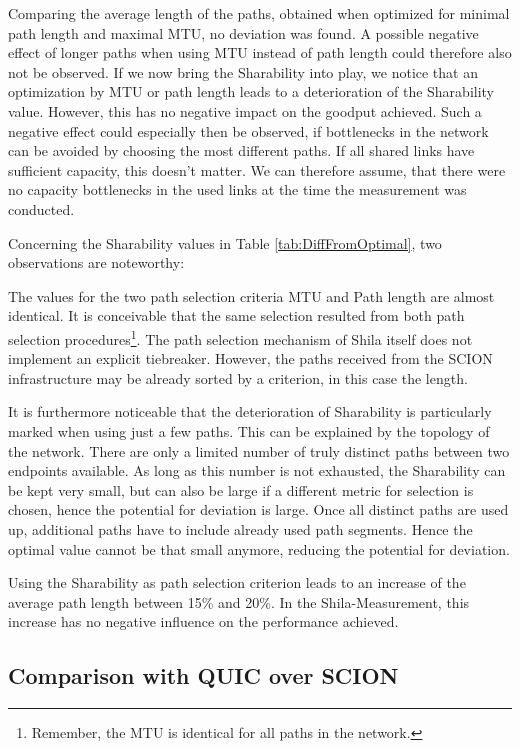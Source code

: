 Comparing the average length of the paths, obtained when optimized for minimal path length and maximal MTU, no deviation was found. A possible negative effect of longer paths when using MTU instead of path length could therefore also not be observed. If we now bring the Sharability into play, we notice that an optimization by MTU or path length leads to a deterioration of the Sharability value. However, this has no negative impact on the goodput achieved. Such a negative effect could especially then be observed,  if bottlenecks in the network can be avoided by choosing the most different paths. If all shared links have sufficient capacity, this doesn't matter. We can therefore assume, that there were no capacity bottlenecks in the used links at the time the measurement was conducted. 

Concerning the Sharability values in Table \ref{tab:DiffFromOptimal}, two observations are noteworthy:

The values for the two path selection criteria MTU and Path length are almost identical. It is conceivable that the same selection resulted from both path selection procedures\footnote{Remember, the MTU is identical for all paths in the network.}. The path selection mechanism of Shila itself does not implement an explicit tiebreaker. However, the paths received from the SCION infrastructure may be already sorted by a criterion, in this case the length.

It is furthermore noticeable that the deterioration of Sharability is particularly marked when using just a few paths. This can be explained by the topology of the network. There are only a limited number of truly distinct paths between two endpoints available. As long as this number is not exhausted, the Sharability can be kept very small, but can also be large if a different metric for selection is chosen, hence the potential for deviation is large. Once all distinct paths are used up, additional paths have to include already used path segments. Hence the optimal value cannot be that small anymore, reducing the potential for deviation.

Using the Sharability as path selection criterion leads to an increase of the average path length between 15\% and 20\%. In the Shila-Measurement, this increase has no negative influence on the performance achieved. 

\subsection*{Comparison with QUIC over SCION}
\label{subsec:ComparisonWithQUIC}

